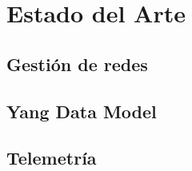 \chapter{Estado del Arte\label{sec:estado_del_arte}}

\section{Gestión de redes\label{sec:gestion_redes}}


\section{Yang Data Model\label{sec:yang_data_model}}


\section{Telemetría}

